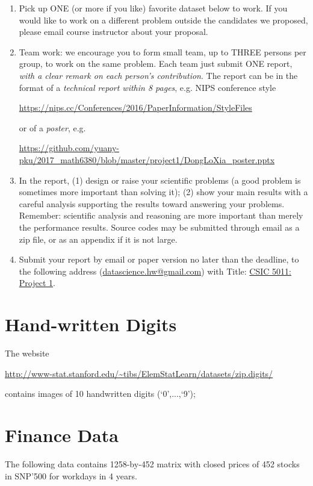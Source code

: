 \documentclass[11pt]{article}
\begin{document}
\begin{enumerate}
\item Pick up ONE (or more if you like) favorite dataset below to work. If you would like to work on a different problem outside the candidates we proposed, please email course instructor about your proposal.  
\item Team work: we encourage you to form small team, up to THREE persons per group, to work on the same problem. Each team just submit ONE report, \emph{with a clear remark on each person's contribution}. The report can be in the format of a \emph{technical report within 8 pages}, e.g. NIPS conference style 
\begin{center}
\url{https://nips.cc/Conferences/2016/PaperInformation/StyleFiles} 
\end{center}
or of a \emph{poster}, e.g. 
\begin{center}%
\url{https://github.com/yuany-pku/2017_math6380/blob/master/project1/DongLoXia_poster.pptx}
\end{center}
\item In the report, (1) design or raise your scientific problems (a good problem is sometimes more important than solving it); (2) show your main results with a careful analysis supporting the results toward answering your problems. Remember: scientific analysis and reasoning are more important than merely the performance results. Source codes may be submitted through email as a zip file, or as an appendix if it is not large.    
\item Submit your report by email or paper version no later than the deadline, to the following address (\href{mailto:datascience.hw@gmail.com}{datascience.hw@gmail.com}) with Title: \underline{CSIC 5011: Project 1}. %
\end{enumerate}

\section{Hand-written Digits} The website 

\url{http://www-stat.stanford.edu/\~tibs/ElemStatLearn/datasets/zip.digits/}

\noindent contains images of 10 handwritten digits (`$0$',...,`9');

\section{Finance Data}
The following data contains 1258-by-452 matrix with closed prices of 452 stocks in SNP'500 for workdays in 4 years.
\end{document}
